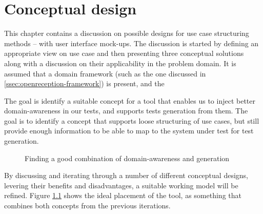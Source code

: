 \chapter{Conceptual design}
\label{chap:conceptual_design}
This chapter contains a discussion on possible designs for use case structuring methods -- with user interface mock-ups. The discussion is started by defining an appropriate view on use case and then presenting three conceptual solutions along with a discussion on their applicability in the problem domain. It is assumed that a domain framework (such as the one discussed in \ref{ssec:openreception-framework}) is present, and the \medskip

\noindent The goal is identify a suitable concept for a tool that enables us to inject better domain-awareness in our tests, and supports tests generation from them. The goal is to identify a concept that supports loose structuring of use cases, but still provide enough information to be able to map to the system under test for test generation.\medskip
\begin{figure}[!htbp]
\centering

\caption{Finding a good combination of domain-awareness and generation}
\label{fig:project_parameter_plot_project}
\end{figure}

\noindent By discussing and iterating through a number of different conceptual designs, levering their benefits and disadvantages, a suitable  working model will be refined. Figure \ref{fig:project_parameter_plot_project} shows the ideal placement of the tool, as something that combines both concepts from the previous iterations.

